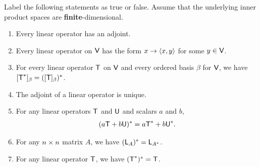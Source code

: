 \exercisesection

\begin{exercise} \label{exercise 6.3.1}
Label the following statements as true or false.
Assume that the underlying inner product spaces are \textbf{finite}-dimensional.
\begin{enumerate}
\item Every linear operator has an adjoint.
\item Every linear operator on \(\textsf{V}\) has the form \(x \to \left< x, y \right>\) for some \(y \in \textsf{V}\).
\item For every linear operator \(\textsf{T}\) on \(\textsf{V}\) and every ordered basis \(\beta\) for \(\textsf{V}\), we have \([\textsf{T}^*]_{\beta} = ([\textsf{T}]_{\beta})^*\).
\item The adjoint of a linear operator is unique.
\item For any linear operators \(\textsf{T}\) and \(\textsf{U}\) and scalars \(a\) and \(b\),
\[
    (a\textsf{T} + b\textsf{U})^* = a\textsf{T}^*+ b\textsf{U}^*.
\]
\item For any \(n \times n\) matrix \(A\), we have \((\textsf{L}_A)^* = \textsf{L}_{A^*}\).
\item For any linear operator \(\textsf{T}\), we have \((\textsf{T}^*)^* = \textsf{T}\).
\end{enumerate}
\end{exercise}


